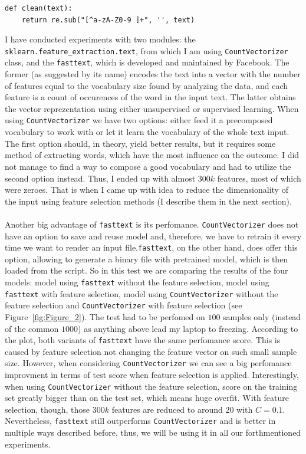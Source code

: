 \documentclass{article}
\begin{document}
\begin{lstlisting}
def clean(text):
    return re.sub("[^a-zA-Z0-9 ]+", '', text)
\end{lstlisting}

I have conducted experiments with two modules: the \lstinline{sklearn.feature_extraction.text}, from which I am 
using \lstinline{CountVectorizer} class, and the \lstinline{fasttext}, which is developed and maintained by Facebook.
The former (as suggested by its name) encodes the text into a vector with the number of features equal to the 
vocabulary size found by analyzing the data, and each feature is a count of occurences of the word in the input text. 
The latter obtains the vector reprezentation using either unsupervised or supervised learning. When using \lstinline{CountVectorizer}
we have two options: either feed it a precomposed vocabulary to work with or let it learn the vocabulary of the whole
text input. The first option should, in theory, yield better results, but it requires some method of extracting 
words, which have the most influence on the outcome. I did not manage to find a way to compose a good vocabulary and
had to utilize the second option instead. Thus, I ended up with almost $300k$ features, most of which were zeroes.
That is when I came up with idea to reduce the dimensionality of the input using feature selection methods (I describe
them in the next section). \\ \\
Another big advantage of \lstinline{fasttext} is its perfomance. \lstinline{CountVectorizer} does not have an option to 
save and reuse model and, therefore, we have to retrain it every time we want to render an input file.\lstinline{fasttext},
on the other hand, does offer this option, allowing to generate a binary file with pretrained model, which is then loaded
from the script. So in this test we are comparing the results of the four models: model using \lstinline{fasttext}
without the feature selection, model using \lstinline{fasttext} with feature selection, model using \lstinline{CountVectorizer} without the
feature selection and \lstinline{CountVectorizer} with feature selection (see Figure~\ref{fig:Figure_2}). The test had
to be perfomed on $100$ samples only (instead of the common $1000$) as anything above lead my laptop to freezing.
According to the plot, both variants of \lstinline{fasttext} have the same perfomance score. This is caused by feature selection
not changing the feature vector on such small sample size. However, when considering \lstinline{CountVectorizer}
we can see a big perfomance improvment in terms of test score when feature selection is applied. Interestingly, 
when using \lstinline{CountVectorizer} without the feature selection, score on the training set greatly bigger
than on the test set, which means huge overfit. With feature selection, though, those $300k$ features are reduced 
to around $20$ with $C=0.1$. Nevertheless, \lstinline{fasttext} still outperforms \lstinline{CountVectorizer} and 
is better in multiple ways described before, thus, we will be using it in all our forthmentioned experiments. 
\end{document}
